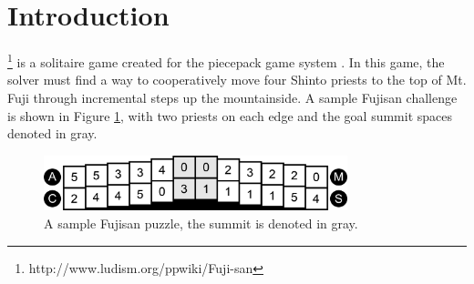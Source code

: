 \documentclass[10pt,journal,compsoc]{IEEEtran}
\begin{document}
\ifCLASSOPTIONcompsoc
{}
\else
\section{Introduction}
\label{sec:introduction}
\fi




% 
% 
% 
% 
\footnote{http://www.ludism.org/ppwiki/Fuji-san} is a solitaire game created for the piecepack game system \cite{GAMESYSTEM}. In this game, the solver must find a way to cooperatively move four Shinto priests to the top of Mt. Fuji through incremental steps up the mountainside. A sample Fujisan challenge is shown in Figure \ref{fig:SampleFujisan}, with two priests on each edge and the goal summit spaces denoted in gray. 

\begin{figure}[b]
\includegraphics[width=8.8cm]{graphics/piecepackexample.png}
\caption{A sample Fujisan puzzle, the summit is denoted in gray.}
\label{fig:SampleFujisan}
\end{figure}
\end{document}
